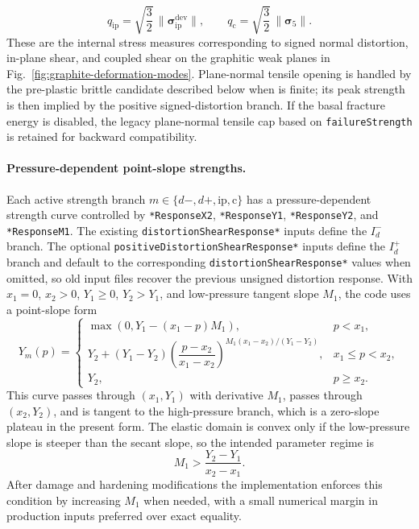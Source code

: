 \begin{equation}
  q_{\mathrm{ip}} = \sqrt{\frac{3}{2}}\,\|\boldsymbol{\sigma}_{\mathrm{ip}}^{\mathrm{dev}}\|,
  \qquad
  q_{\mathrm{c}} = \sqrt{\frac{3}{2}}\,\|\boldsymbol{\sigma}_5\|.
  \label{eq:graphite-mode-invariants}
\end{equation}
These are the internal stress measures corresponding to signed normal distortion, in-plane shear, and coupled shear on the graphitic weak planes in Fig.~\ref{fig:graphite-deformation-modes}.  Plane-normal tensile opening is handled by the pre-plastic brittle candidate described below when  is finite; its peak strength is then implied by the positive signed-distortion branch.  If the basal fracture energy is disabled, the legacy plane-normal tensile cap based on \texttt{failureStrength} is retained for backward compatibility.

\paragraph{Pressure-dependent point-slope strengths.}
Each active strength branch \(m\in\{d-,d+,\mathrm{ip},\mathrm{c}\}\) has a pressure-dependent strength curve controlled by \texttt{*ResponseX2}, \texttt{*ResponseY1}, \texttt{*ResponseY2}, and \texttt{*ResponseM1}.  The existing \texttt{distortionShearResponse*} inputs define the \(I_d^-\) branch.  The optional \texttt{positiveDistortionShearResponse*} inputs define the \(I_d^+\) branch and default to the corresponding \texttt{distortionShearResponse*} values when omitted, so old input files recover the previous unsigned distortion response.  With \(x_1=0\), \(x_2>0\), \(Y_1\ge 0\), \(Y_2>Y_1\), and low-pressure tangent slope \(M_1\), the code uses a point-slope form
\begin{equation}
Y_m(p)=
\begin{cases}
  \max\left(0, Y_1-(x_1-p)M_1\right), & p<x_1,\\[0.4em]
  Y_2+(Y_1-Y_2)\left(\dfrac{p-x_2}{x_1-x_2}\right)^{M_1(x_1-x_2)/(Y_1-Y_2)}, & x_1\le p < x_2,\\[0.8em]
  Y_2, & p\ge x_2.
\end{cases}
\label{eq:graphite-point-slope-strength}
\end{equation}
This curve passes through \((x_1,Y_1)\) with derivative \(M_1\), passes through \((x_2,Y_2)\), and is tangent to the high-pressure branch, which is a zero-slope plateau in the present form.  The elastic domain is convex only if the low-pressure slope is steeper than the secant slope, so the intended parameter regime is
\begin{equation}
  M_1 > \frac{Y_2-Y_1}{x_2-x_1}.
  \label{eq:graphite-point-slope-convexity}
\end{equation}
After damage and hardening modifications the implementation enforces this condition by increasing \(M_1\) when needed, with a small numerical margin in production inputs preferred over exact equality.

